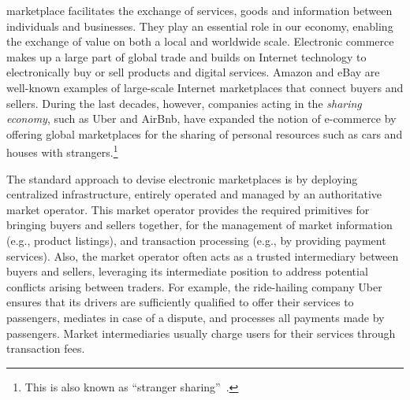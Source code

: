  marketplace facilitates the exchange of services, goods and information between individuals and businesses.
They play an essential role in our economy, enabling the exchange of value on both a local and worldwide scale.
Electronic commerce makes up a large part of global trade and builds on Internet technology to electronically buy or sell products and digital services.
Amazon and eBay are well-known examples of large-scale Internet marketplaces that connect buyers and sellers.
During the last decades, however, companies acting in the \emph{sharing economy}, such as Uber and AirBnb, have expanded the notion of e-commerce by offering global marketplaces for the sharing of personal resources such as cars and houses with strangers.\footnote{This is also known as \enquote{stranger sharing}~\cite{schor2016debating}.}


The standard approach to devise electronic marketplaces is by deploying centralized infrastructure, entirely operated and managed by an authoritative market operator.
This market operator provides the required primitives for bringing buyers and sellers together, for the management of market information (e.g., product listings), and transaction processing (e.g., by providing payment services).
Also, the market operator often acts as a trusted intermediary between buyers and sellers, leveraging its intermediate position to address potential conflicts arising between traders.
For example, the ride-hailing company Uber ensures that its drivers are sufficiently qualified to offer their services to passengers, mediates in case of a dispute, and processes all payments made by passengers.
Market intermediaries usually charge users for their services through transaction fees.

